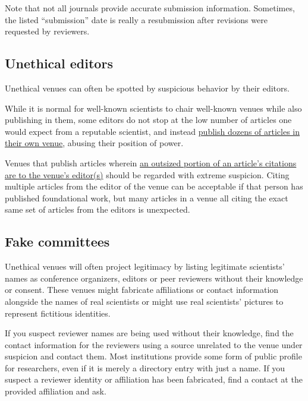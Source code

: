 \documentclass[letterpaper, 12pt]{article}
\begin{document}
Note that not all journals provide accurate submission information. Sometimes, the listed ``submission'' date is really a resubmission after revisions were requested by reviewers.

\subsection*{Unethical editors}

Unethical venues can often be spotted by suspicious behavior by their editors.

While it is normal for well-known scientists to chair well-known venues while also publishing in them,
some editors do not stop at the low number of articles one would expect from a reputable scientist,
and instead \href{https://deevybee.blogspot.com/2020/08/pepiops-prolific-editors-who-publish-in.html}{publish dozens of articles in their own venue}, abusing their position of power.

Venues that publish articles wherein \href{https://pubpeer.com/publications/57BB3F8859A0F5BE6FBC4DB70F2E8E}{an outsized portion of an article's citations are to the venue's editor(s)} should be regarded with extreme suspicion. Citing multiple articles from the editor of the venue
can be acceptable if that person has published foundational work,
but many articles in a venue all citing the exact same set of articles from the editors is unexpected.

\subsection*{Fake committees}

Unethical venues will often project legitimacy by listing legitimate scientists' names as conference organizers, editors or peer reviewers without their knowledge or consent. These venues might fabricate affiliations or contact information alongside the names of real scientists or might use real scientists' pictures to represent fictitious identities. 

If you suspect reviewer names are being used without their knowledge, find the contact information for the reviewers
using a source unrelated to the venue under suspicion and contact them. Most institutions provide some form of public profile for researchers,
even if it is merely a directory entry with just a name.
If you suspect a reviewer identity or affiliation has been fabricated, find a contact at the provided affiliation and ask.
\end{document}
